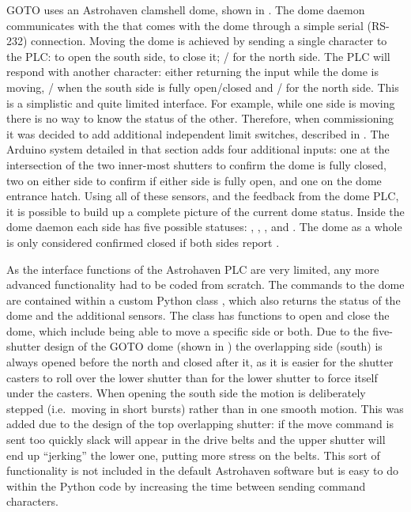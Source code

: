 \begin{colsection}
GOTO uses an Astrohaven clamshell dome, shown in . The dome daemon communicates with the  that comes with the dome through a simple serial (RS-232) connection. Moving the dome is achieved by sending a single character to the PLC:\@ {} to open the south side,  to close it; / for the north side. The PLC will respond with another character: either returning the input while the dome is moving, / when the south side is fully open/closed and / for the north side. This is a simplistic and quite limited interface. For example, while one side is moving there is no way to know the status of the other. Therefore, when commissioning it was decided to add additional independent limit switches, described in . The Arduino system detailed in that section adds four additional inputs: one at the intersection of the two inner-most shutters to confirm the dome is fully closed, two on either side to confirm if either side is fully open, and one on the dome entrance hatch. Using all of these sensors, and the feedback from the dome PLC, it is possible to build up a complete picture of the current dome status. Inside the dome daemon each side has five possible statuses: , , ,  and . The dome as a whole is only considered confirmed closed if both sides report .

As the interface functions of the Astrohaven PLC are very limited, any more advanced functionality had to be coded from scratch. The commands to the dome are contained within a custom Python class , which also returns the status of the dome and the additional sensors. The class has functions to open and close the dome, which include being able to move a specific side or both. Due to the five-shutter design of the GOTO dome (shown in ) the overlapping side (south) is always opened before the north and closed after it, as it is easier for the shutter casters to roll over the lower shutter than for the lower shutter to force itself under the casters. When opening the south side the motion is deliberately stepped (i.e.\ moving in short bursts) rather than in one smooth motion. This was added due to the design of the top overlapping shutter: if the move command is sent too quickly slack will appear in the drive belts and the upper shutter will end up ``jerking'' the lower one, putting more stress on the belts. This sort of functionality is not included in the default Astrohaven software but is easy to do within the Python code by increasing the time between sending command characters.


\end{colsection}
